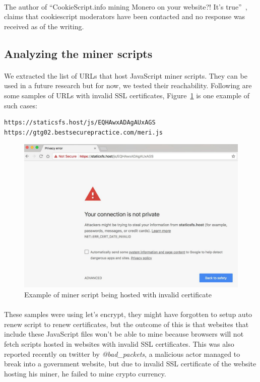 \documentclass[letterpaper]{scrartcl} %
\numberwithin{equation}{section} %
\numberwithin{figure}{section} %
\numberwithin{table}{section} %
\begin{document}
\paragraph{}
The author of ``CookieScript.info mining Monero on your website?! It's true''~\cite{ref:cookiescript}, claims that cookiescript moderators have been contacted and no response was received as of the writing.

\subsection{Analyzing the miner scripts}
\paragraph{}
We extracted the list of URLs that host JavaScript miner scripts. They can be used in a future research but for now, we tested their reachability. Following are some samples of URLs with invalid SSL certificates, Figure~\ref{fig:miner-invalid-certificate} is one example of such cases:
\begin{lstlisting}
https://staticsfs.host/js/EQHAwxADAgAUxAGS
https://gtg02.bestsecurepractice.com/meri.js
\end{lstlisting}

\begin{figure}[t]
\centering
\includegraphics[width=0.8\columnwidth]{figures/miner-invalid-certificate.jpg}
\caption{Example of miner script being hosted with invalid certificate}
\label{fig:miner-invalid-certificate}
\end{figure}

\paragraph{}
These samples were using let's encrypt, they might have forgotten to setup auto renew script to renew certificates, but the outcome of this is that websites that include these JavaScript files won't be able to mine because browsers will not fetch scripts hosted in websites with invalid SSL certificates. This was also reported recently on twitter by \textit{@bad\_packets}, a malicious actor managed to break into a government website, but due to invalid SSL certificate of the website hosting his miner, he failed to mine crypto currency.
\end{document}
